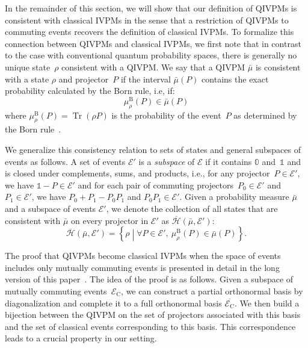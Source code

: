 \documentclass[english,reprint, aps, prl,superscriptaddress, showpacs,
showkeys, longbibliography, amsmath, amssymb, floatfix]{revtex4-1}
\theoremstyle{plain}
\theoremstyle{definition}
\newcommand{\Hilb}{\mathcal{H}}
\newcommand{\events}{\ensuremath{\mathcal{E}}}
\newcommand{\set}[2]{\ensuremath{\left\{ {#1}\mathrel{}\middle|\mathrel{}{#2}\right\} }}
\newcommand{\Tr}{\ensuremath{\mathop{\mathrm{Tr}}\nolimits}}
\newcommand{\coreBorn}{\ensuremath{\overline{\Hilb}}}
\begin{document}
In the remainder of this section, we will show that our definition of
QIVPMs is consistent with classical IVPMs in the sense that a
restriction of QIVPMs to commuting events recovers the definition of
classical IVPMs. To formalize this connection between QIVPMs and
classical IVPMs, we first note that in contrast to the case with
conventional quantum probability spaces, there is generally no unique
state~$\rho$ consistent with a QIVPM. We say that a QIVPM $\bar{\mu}$
is consistent with a state $\rho$ and projector~$P$ if the interval
$\bar{\mu}(P)$ contains the exact probability calculated by the Born
rule, i.e, if:
\begin{equation}
\mu_{\rho}^{\mathrm{B}}\left(P\right)\in\bar{\mu}\left(P\right)
\end{equation}
where $\mu_{\rho}^{\mathrm{B}}\left(P\right)=\Tr\left(\rho P\right)$
is the probability of the event~$P$ as determined by the Born
rule~\citep{Born1983,Mermin2007,Jaeger2007}.

We generalize this consistency relation to sets of states and general
subspaces of events as follows. A set of events $\events'$ is a
\emph{subspace} of $\events$ if it contains $\mathbb{0}$
and~$\mathbb{1}$ and is closed under complements, sums, and products,
i.e., for any projector~$P\in\events'$, we have
$\mathbb{1}-P\in\events'$ and for each pair of commuting
projectors~$P_{0}\in\events'$ and $P_{1}\in\events'$, we have
$P_{0}+P_{1}-P_{0}P_{1}$ and $P_{0}P_{1}\in\events'$. Given a
probability measure $\bar{\mu}$ and a subspace of events $\events'$,
we denote the collection of all states that are consistent with
$\bar{\mu}$ on every projector in $\events'$ as
$\coreBorn(\bar{\mu},\events')$:
\begin{equation}
\label{eq:hbar}
\coreBorn\left(\bar{\mu},\events'\right)=\set{\rho}{\forall P\in \events',~\mu_{\rho}^{\mathrm{B}}\left(P\right)\in\bar{\mu}\left(P\right)}.
\end{equation}

The proof that QIVPMs become classical IVPMs when the space of events
includes only mutually commuting events is presented in detail in the
long version of this paper~\cite{HOSTunpublished}. The idea of the
proof is as follows. Given a subspace of mutually commuting
events~$\events_{\mathrm{C}}$, we can construct a partial orthonormal
basis by diagonalization and complete it to a full orthonormal basis
$\overline{\events_{\mathrm{C}}}$. We then build a bijection between
the QIVPM on the set of projectors associated with this basis and the
set of classical events corresponding to this basis. This
correspondence leads to a crucial property in our setting.
\end{document}
